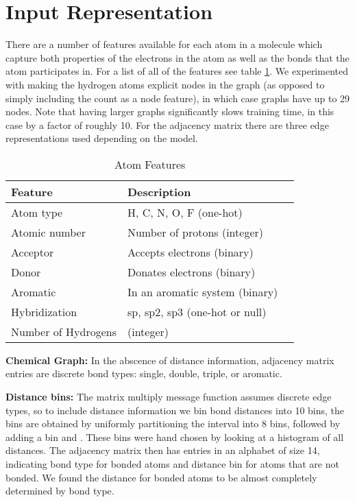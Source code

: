 \documentclass{article}
\begin{document}
\section{Input Representation} \label{subsec:input}
There are a number of features available for each atom in a molecule which capture both properties of the electrons in the atom as well as the bonds that the atom participates in. For a list of all of the features see table \ref{tb:features}. We experimented with making the hydrogen atoms explicit nodes in the graph (as opposed to simply including the count as a node feature), in which case graphs have up to 29 nodes. Note that having larger graphs significantly slows training time, in this case by a factor of roughly 10. For the adjacency matrix there are three edge representations used depending on the model. 

\begin{table}[t]
\centering
\caption{Atom Features}
\label{tb:features}
\begin{tabular}{lll}
\hline
\abovespace\belowspace
Feature             & Description                                      &  \\
\hline
\abovespace

Atom type           & H, C, N, O, F (one-hot)                  &  \\
Atomic number       & Number of protons (integer)                      &  \\
Acceptor            & Accepts electrons (binary)        &  \\
Donor               & Donates electrons (binary)        &  \\
Aromatic            & In an aromatic system (binary) &  \\
Hybridization       & sp, sp2, sp3 (one-hot or null)                   &  \\
Number of Hydrogens & (integer)        & 
\end{tabular}


\end{table}


\textbf{Chemical Graph:}
In the abscence of distance information, adjacency matrix entries are discrete bond types: single, double, triple, or aromatic.


\textbf{Distance bins:}
The matrix multiply message function assumes discrete edge types, so to include distance information we bin bond distances into 10 bins, the bins are obtained by uniformly partitioning the interval  into 8 bins, followed by adding a bin  and . These bins were hand chosen by looking at a histogram of all distances. The adjacency matrix then has entries in an alphabet of size 14, indicating bond type for bonded atoms and distance bin for atoms that are not bonded. We found the distance for bonded atoms to be almost completely determined by bond type.
\end{document}

